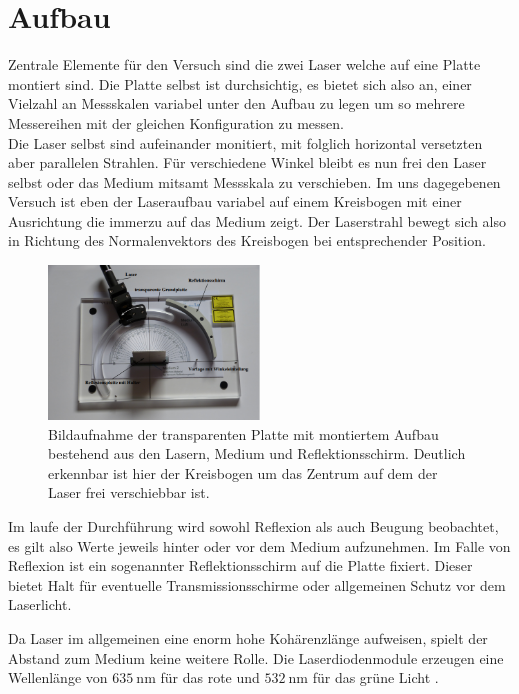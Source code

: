 \newpage
\section{Aufbau}
Zentrale Elemente für den Versuch sind die zwei Laser welche auf eine Platte montiert sind. Die Platte selbst ist durchsichtig,
es bietet sich also an, einer Vielzahl an Messskalen variabel unter den Aufbau zu legen um so mehrere Messereihen mit der gleichen 
Konfiguration zu messen. \\
Die Laser selbst sind aufeinander monitiert, mit folglich horizontal versetzten aber parallelen Strahlen. Für verschiedene
Winkel bleibt es nun frei den Laser selbst oder das Medium mitsamt Messskala zu verschieben. Im uns dagegebenen Versuch 
ist eben der Laseraufbau variabel auf einem Kreisbogen mit einer Ausrichtung die immerzu auf das Medium zeigt. Der Laserstrahl 
bewegt sich also in Richtung des Normalenvektors des Kreisbogen bei entsprechender Position. 
\begin{figure}
    \centering
    \includegraphics[width=0.5\textwidth]{bilder/afbau.png}
    \caption{Bildaufnahme der transparenten Platte mit montiertem Aufbau bestehend aus den Lasern, Medium und Reflektionsschirm.
    Deutlich erkennbar ist hier der Kreisbogen um das Zentrum auf dem der Laser frei verschiebbar ist. \cite{skript}} 
    \label{fig:teile}
\end{figure}
\FloatBarrier
\flushleft Im laufe der Durchführung wird sowohl Reflexion als auch Beugung beobachtet, es gilt also Werte jeweils hinter oder vor dem Medium 
aufzunehmen. Im Falle von Reflexion ist ein sogenannter Reflektionsschirm auf die Platte fixiert. Dieser bietet Halt für eventuelle
Transmissionsschirme oder allgemeinen Schutz vor dem Laserlicht.

Da Laser im allgemeinen eine enorm hohe Kohärenzlänge aufweisen, spielt der Abstand zum Medium keine weitere Rolle. 
Die Laserdiodenmodule erzeugen eine Wellenlänge von $\SI{635}{\nano\meter}$ für das rote und $\SI{532}{\nano\meter}$ für das
grüne Licht \cite{skript}.

